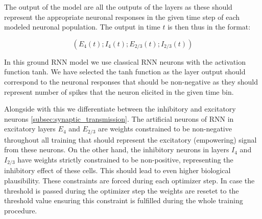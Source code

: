 The output of the model are all the outputs of the layers as these should represent the appropriate neuronal responses in the given time step of each modeled neuronal population. The output in time $t$ is then thus in the format:

$$ (E_4(t); I_4(t); E_{2/3}(t); I_{2/3}(t)) $$

In this ground RNN model we use classical RNN neurons with the activation function tanh. We have selected the tanh function as the layer output should correspond to the neuronal responses that should be non-negative as they should represent number of spikes that the neuron elicited in the given time bin.

Alongside with this we differentiate between the inhibitory and excitatory neurons \ref{subsec:synaptic_transmission}. The artificial neurons of RNN in excitatory layers $E_4$ and $E_{2/3}$ are weights constrained to be non-negative throughout all training that should represent the excitatory (empowering) signal from these neurons. On the other hand, the inhibitory neurons in layers $I_4$ and $I_{2/3}$ have weights strictly constrained to be non-positive, representing the inhibitory effect of these cells. This should lead to even higher biological plausibility. These constraints are forced during each optimizer step. In case the threshold is passed during the optimizer step the weights are resetet to the threshold value ensuring this constraint is fulfilled during the whole training procedure.